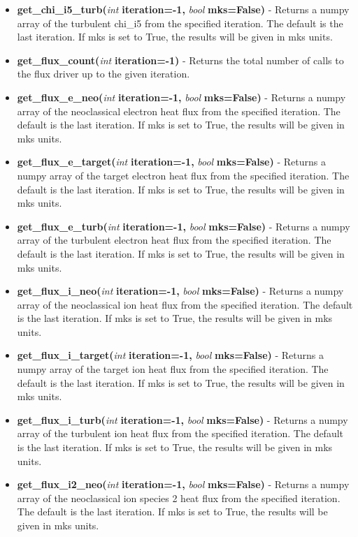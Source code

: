 \documentclass{article}
\begin{document}
\begin{itemize}
\begin{itemize}
\item \textbf{get\_chi\_i5\_turb(}\emph{int}\textbf{ iteration=-1,}\emph{ bool}\textbf{ mks=False)} - Returns a numpy array of the turbulent chi\_i5 from the specified iteration.  The default is the last iteration.  If mks is set to True, the results will be given in mks units.
\item \textbf{get\_flux\_count(}\emph{int}\textbf{ iteration=-1)} - Returns the total number of calls to the flux driver up to the given iteration.
\item \textbf{get\_flux\_e\_neo(}\emph{int}\textbf{ iteration=-1,}\emph{ bool}\textbf{ mks=False)} - Returns a numpy array of the neoclassical electron heat flux from the specified iteration.  The default is the last iteration.  If mks is set to True, the results will be given in mks units.
\item \textbf{get\_flux\_e\_target(}\emph{int}\textbf{ iteration=-1,}\emph{ bool}\textbf{ mks=False)} - Returns a numpy array of the target electron heat flux from the specified iteration.  The default is the last iteration.  If mks is set to True, the results will be given in mks units.
\item \textbf{get\_flux\_e\_turb(}\emph{int}\textbf{ iteration=-1,}\emph{ bool}\textbf{ mks=False)} - Returns a numpy array of the turbulent electron heat flux from the specified iteration.  The default is the last iteration.  If mks is set to True, the results will be given in mks units.
\item \textbf{get\_flux\_i\_neo(}\emph{int}\textbf{ iteration=-1,}\emph{ bool}\textbf{ mks=False)} - Returns a numpy array of the neoclassical ion heat flux from the specified iteration.  The default is the last iteration.  If mks is set to True, the results will be given in mks units.
\item \textbf{get\_flux\_i\_target(}\emph{int}\textbf{ iteration=-1,}\emph{ bool}\textbf{ mks=False)} - Returns a numpy array of the target ion heat flux from the specified iteration.  The default is the last iteration.  If mks is set to True, the results will be given in mks units.
\item \textbf{get\_flux\_i\_turb(}\emph{int}\textbf{ iteration=-1,}\emph{ bool}\textbf{ mks=False)} - Returns a numpy array of the turbulent ion heat flux from the specified iteration.  The default is the last iteration.  If mks is set to True, the results will be given in mks units.
\item \textbf{get\_flux\_i2\_neo(}\emph{int}\textbf{ iteration=-1,}\emph{ bool}\textbf{ mks=False)} - Returns a numpy array of the neoclassical ion species 2 heat flux from the specified iteration.  The default is the last iteration.  If mks is set to True, the results will be given in mks units.

\end{itemize}
\end{itemize}
\end{document}
